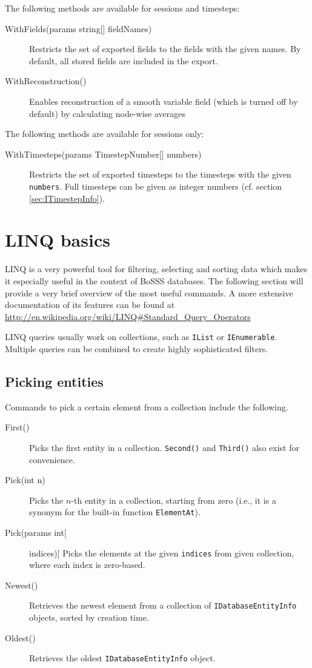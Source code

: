 The following methods are available for sessions and timesteps:
\begin{description}
	\item[WithFields(params string{[}{]} fieldNames)]
	Restricts the set of exported fields to the fields with the given names. By default, all stored fields are included in the export.
	
	\item[WithReconstruction()]
	Enables reconstruction of a smooth variable field (which is turned off by default) by calculating node-wise averages
\end{description}

The following methods are available for sessions only:
\begin{description}
	\item[WithTimesteps(params TimestepNumber{[}{]} numbers)]
	Restricts the set of exported timesteps to the timesteps with the given \lstinline{numbers}. Full timesteps can be given as integer numbers (cf. section \ref{sec:ITimestepInfo}).
\end{description}


\section{LINQ basics}
LINQ is a very powerful tool for filtering, selecting and sorting data which makes it especially useful in the context of BoSSS databases.
The following section will provide a very brief overview of the most useful commands. A more extensive documentation of its features can be found at
\url{http://en.wikipedia.org/wiki/LINQ#Standard\_Query\_Operators}

LINQ queries usually work on collections, such as \lstinline{IList} or \lstinline{IEnumerable}.
Multiple queries can be combined to create highly sophisticated filters.

\subsection{Picking entities}
Commands to pick a certain element from a collection include the following.
\begin{description}
	\item[First()]
	Picks the first entity in a collection. \lstinline{Second()} and \lstinline{Third()} also exist for convenience.
	
	\item[Pick(int n)]
	Picks the $n$-th entity in a collection, starting from zero (i.e., it is a synonym for the built-in function \lstinline{ElementAt}).
	
	\item[Pick(params int[] indices)]
	Picks the elements at the given \lstinline{indices} from given collection, where each index is zero-based.
	
	\item[Newest()]
	Retrieves the newest element from a collection of \lstinline{IDatabaseEntityInfo} objects, sorted by creation time.
	
	\item[Oldest()]
	Retrieves the oldest \lstinline{IDatabaseEntityInfo} object.
\end{description}

